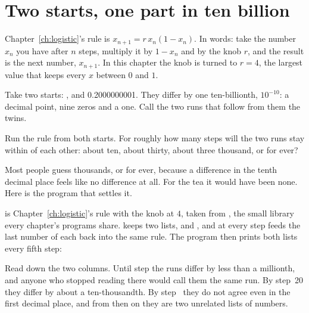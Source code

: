 \section{Two starts, one part in ten billion}
\label{sec:ch06-twins}

\noindent
Chapter~\ref{ch:logistic}'s rule is $x_{n+1} = r\,x_n(1 - x_n)$. In words:
take the number $x_n$ you have after $n$ steps, multiply it by $1 - x_n$
and by the knob $r$, and the result is the next number, $x_{n+1}$. In this
chapter the knob is turned to $r = 4$, the largest value that keeps every
$x$ between $0$ and $1$.

Take two starts: , and \num{0.2000000001}. They differ by
one ten-billionth, $10^{-10}$: a decimal point, nine zeros and a one.
Call the two runs that follow from them the twins.

\begin{think}
Run the rule from both starts. For roughly how many steps will the two runs
stay within  of each other: about ten, about thirty, about three
thousand, or for ever?
\end{think}
Most people guess thousands, or for ever, because a difference in the tenth
decimal place feels like no difference at all. For the tea it would have
been none. Here is the program that settles it.


\noindent
{} is Chapter~\ref{ch:logistic}'s rule with the knob at
$4$, taken from , the small library every chapter's programs
share.  keeps two lists,  and , and at every
step feeds the last number of each back into the same rule. The program then
prints both lists every fifth step:


\noindent
Read down the two columns. Until step  the runs
differ by less than a millionth, and anyone who stopped reading there would
call them the same run. By step~20 they differ by about a ten-thousandth. By
step~ they do not agree even in the first decimal place,
and from then on they are two unrelated lists of numbers.


